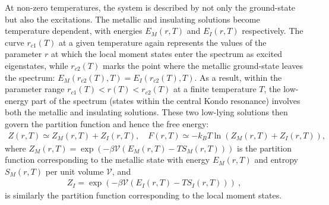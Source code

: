 At non-zero temperatures, the system is described by not only the ground-state but also the excitations. The metallic and insulating solutions become temperature dependent, with energies \(E_M(r,T)\) and \(E_I(r,T)\) respectively. The curve \(r_{c1}(T)\) at a given temperature again represents the values of the parameter \(r\) at which the local moment states enter the spectrum as excited eigenstates, while \(r_{c2}(T)\) marks the point where the metallic ground-state leaves the spectrum: \(E_M(r_{c2}(T), T) = E_I(r_{c2}(T), T)\). As a result, within the parameter range \(r_{c1}(T) < r(T) < r_{c2}(T)\) at a finite temperature \(T\), the low-energy part of the spectrum (states within the central Kondo resonance) involves both the metallic and insulating solutions. These two low-lying solutions then govern the partition function and hence the free energy:
\begin{eqnarray}
	Z(r,T) \simeq Z_M(r,T) + Z_I(r,T),\quad F(r,T) \simeq -k_B T \ln \left(Z_M(r,T) + Z_I(r,T)\right),\label{free energy eq}
\end{eqnarray}
where \(Z_M(r,T) = \exp{\left(-\beta \mathcal{V}\left(E_M(r,T) - TS_M(r,T)\right)\right)}\) is the partition function corresponding to the metallic state with energy \(E_M(r,T)\) and entropy \(S_M(r,T)\) per unit volume \(\mathcal{V}\), and 
\begin{equation}\begin{aligned}
Z_I = \exp{\left(-\beta \mathcal{V}\left(E_I(r,T) - TS_I(r,T)\right)\right)}~,
\end{aligned}\end{equation}
is similarly the partition function corresponding to the local moment states.

